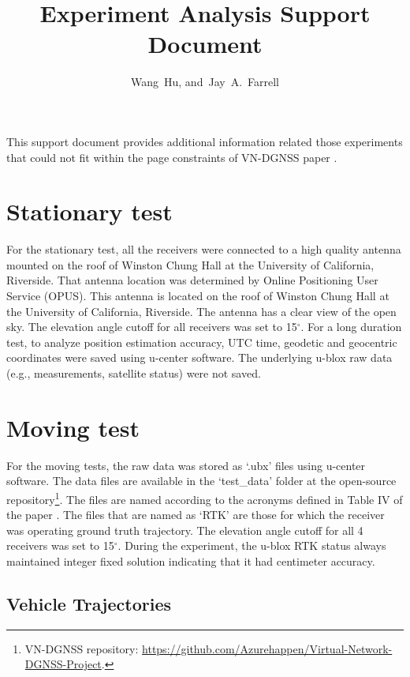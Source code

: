 \documentclass[letterpaper, 10 pt,onecolumn]{article}
\begin{document}
	\title{Experiment Analysis Support Document}
	\author{Wang~Hu,
		and~Jay~A.~Farrell
	}
	\maketitle
	
	
	This support document provides additional information related those experiments that could not fit within the page constraints of VN-DGNSS paper \cite{hu2021using}.
	
	\section{Stationary test}
	
	For the stationary test, all the receivers were connected to a high quality antenna mounted on the roof of Winston Chung Hall at the University of California, Riverside. That antenna location was determined by Online Positioning User Service (OPUS). This antenna is located on the roof of Winston Chung Hall at the University of California, Riverside. The antenna has a clear view of the open sky. The elevation angle cutoff for all receivers was set to 15$^\circ$. For a long duration test, to analyze position estimation accuracy, UTC time, geodetic and geocentric coordinates were saved using u-center software. The underlying u-blox raw data (e.g., measurements, satellite status) were not saved.
	
	
	\section{Moving test}
	
	For the moving tests, the raw data was stored as `.ubx' files using u-center software. The data files are available in the `test\_data' folder at the open-source repository\footnote{VN-DGNSS repository: \url{https://github.com/Azurehappen/Virtual-Network-DGNSS-Project}.}. The files are named according to the acronyms defined in Table IV of the paper \cite{hu2021using}. The files that are named as `RTK' are those for which the receiver was operating ground truth trajectory. The elevation angle cutoff for all 4 receivers was set to 15$^\circ$. During the experiment, the u-blox RTK status always maintained integer fixed solution indicating that it had centimeter accuracy.
	
	\subsection{Vehicle Trajectories}	
	
\end{document}
